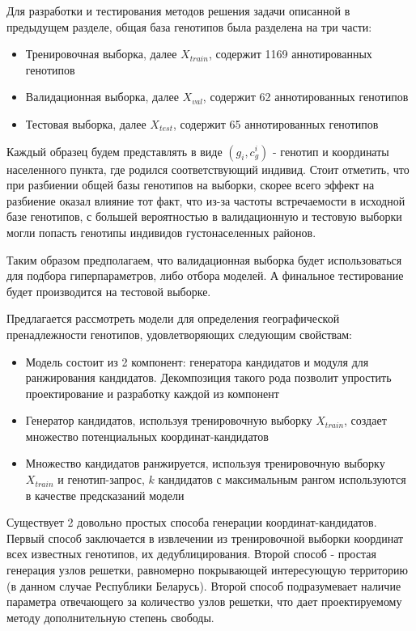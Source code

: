 Для разработки и тестирования методов решения задачи описанной в предыдущем разделе,
общая база генотипов была разделена на три части:

\begin{itemize}
\item Тренировочная выборка, далее $X_{train}$, содержит 1169 аннотированных генотипов
\item Валидационная выборка, далее $X_{val}$, содержит 62 аннотированных генотипов
\item Тестовая выборка, далее $X_{test}$, содержит 65 аннотированных генотипов
\end{itemize}

Каждый образец будем представлять в виде $(g_i, c^i_{g})$ - генотип и координаты населенного пункта,
где родился соответствующий индивид. Стоит отметить, что при разбиении общей базы генотипов
на выборки, скорее всего эффект на разбиение оказал влияние тот факт,
что из-за частоты встречаемости в исходной базе генотипов, с большей вероятностью
в валидационную и тестовую выборки могли попасть генотипы индивидов густонаселенных районов.

Таким образом предполагаем, что валидационная выборка будет использоваться для подбора гиперпараметров,
либо отбора моделей. А финальное тестирование будет производится на тестовой выборке.

Предлагается рассмотреть модели для определения географической пренадлежности генотипов, удовлетворяющих следующим свойствам:
\begin{itemize}
\item Модель состоит из 2 компонент: генератора кандидатов и модуля для ранжирования кандидатов.
Декомпозиция такого рода позволит упростить проектирование и разработку каждой из компонент
\item Генератор кандидатов, используя тренировочную выборку $X_{train}$, создает множество потенциальных
координат-кандидатов
\item Множество кандидатов ранжируется, используя тренировочную выборку $X_{train}$ и генотип-запрос,
$k$ кандидатов с максимальным рангом используются в качестве предсказаний модели
\end{itemize}

Существует 2 довольно простых способа генерации координат-кандидатов. Первый способ
заключается в извлечении из тренировочной выборки координат всех известных генотипов,
их дедублицирования. Второй способ - простая генерация узлов решетки, равномерно покрывающей
интересующую территорию (в данном случае Республики Беларусь). Второй способ подразумевает
наличие параметра отвечающего за количество узлов решетки, что дает проектируемому методу
дополнительную степень свободы.

